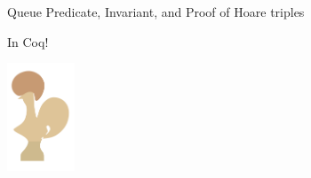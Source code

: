 \documentclass[9pt,xcolor={dvipsnames}]{beamer}
\begin{document}
\begin{frame}{Queue Predicate, Invariant, and Proof of Hoare triples}
  \begin{center}
    {\fontsize{40}{60}\selectfont \textcolor[RGB]{206,186,142}{In} \textcolor[RGB]{222,196,152}{Coq}\textcolor[RGB]{199,154,115}{!}}\\
  \end{center}
  \begin{center}
    \includegraphics[width=0.15\textwidth]{coq-logo-large.png}
  \end{center}
\end{frame}

\end{document}
